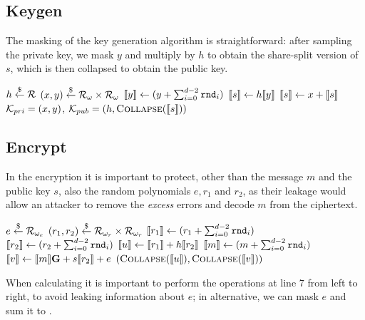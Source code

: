     \subsection{Keygen}
    The masking of the key generation algorithm is straightforward: after sampling the private key, we mask $y$ and multiply 
    by $h$ to obtain the share-split version of $s$, which is then collapsed to obtain the public key.
    
    \begin{algorithm2e}[H]
        \caption{Keygen, masked version}

        $h  \stackrel{\$}{\gets}  \mathcal{R}$\;
        $(x,y)  \stackrel{\$}{\gets}  \mathcal{R}_\omega \times \mathcal{R}_\omega$\;
        $ \llbracket y \rrbracket  \gets (y+\sum_{i=0}^{d-2} \mathtt{rnd}_i)$\;
        $ \llbracket s \rrbracket  \gets h  \llbracket y \rrbracket $\;
        $ \llbracket s \rrbracket  \gets x +  \llbracket s \rrbracket $
        \KwRet $\mathcal{K}_{pri}=(x,y)$, $\mathcal{K}_{pub} = (h,\textsc{Collapse}( \llbracket s \rrbracket ))$\;
        \end{algorithm2e}

    \subsection{Encrypt}
    In the encryption it is important to protect, other than the message $m$ and the public key $s$, also the random polynomials
    $e,r_1$ and $r_2$, as their leakage would allow an attacker to remove the \textit{excess} errors and decode $m$ from the ciphertext.
    
    \begin{algorithm2e}[H]
        \caption{Encryption, masked version}

        $e  \stackrel{\$}{\gets}  \mathcal{R}_{\omega_e}$\;
        $(r_1,r_2)  \stackrel{\$}{\gets}  \mathcal{R}_{\omega_r} \times \mathcal{R}_{\omega_r}$\;
        $ \llbracket r_1 \rrbracket  \gets (r_1+\sum_{i=0}^{d-2} \mathtt{rnd}_i)$\;
        $ \llbracket r_2 \rrbracket  \gets (r_2+\sum_{i=0}^{d-2} \mathtt{rnd}_i)$\;
        $ \llbracket u \rrbracket  \gets  \llbracket r_1 \rrbracket  + h \llbracket r_2 \rrbracket $\;
        $ \llbracket m \rrbracket  \gets (m+\sum_{i=0}^{d-2} \mathtt{rnd}_i) $\;
        $ \llbracket v \rrbracket  \gets  \llbracket m \rrbracket \mathbf{G} + s  \llbracket r_2 \rrbracket  + e $\;
        \KwRet $(\textsc{Collapse}( \llbracket u \rrbracket ),\textsc{Collapse}( \llbracket v \rrbracket ))$\;
    \end{algorithm2e}
    When calculating  it is important to perform the operations at line 7 from left to right, to avoid leaking
    information about $e$; in alternative, we can mask $e$ and sum it to .

